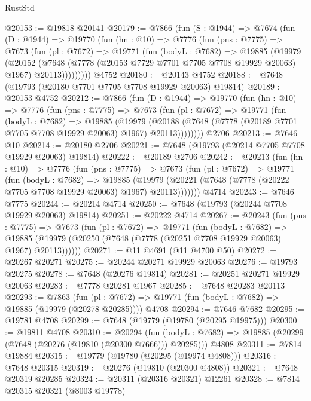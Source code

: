 \begin{lexlean}{RustStd}
\begin{coremodule}
{\begin{coremodule}
{{{{{{{{{{{{{{{{{{{{{{{{{{{{{{{{{{{{{{{{{{{{{{{{{{{{{@20153 := @19818 @20141
@20179 := @7866
    (fun (S : @1944) =>
    @7674
      (fun (D : @1944) =>
      @19770
        (fun (hn : @10) =>
        @7776
          (fun (pns : @7775) =>
          @7673
            (fun (pl : @7672) =>
            @19771
              (fun (bodyL : @7682) =>
              @19885
                (@19979
                  (@20152
                    (@7648
                      (@7778 (@20153 @7729 @7701 @7705 @7708 @19929 @20063) @1967)
                      @20113)))))))))
    @4752
@20180 := @20143 @4752
@20188 := @7648 (@19793 (@20180 @7701 @7705 @7708 @19929 @20063) @19814)
@20189 := @20153 @4752
@20212 := @7866
    (fun (D : @1944) =>
    @19770
      (fun (hn : @10) =>
      @7776
        (fun (pns : @7775) =>
        @7673
          (fun (pl : @7672) =>
          @19771
            (fun (bodyL : @7682) =>
            @19885
              (@19979
                (@20188 (@7648 (@7778 (@20189 @7701 @7705 @7708 @19929 @20063) @1967) @20113))))))))
    @2706
@20213 := @7646 @10
@20214 := @20180 @2706
@20221 := @7648 (@19793 (@20214 @7705 @7708 @19929 @20063) @19814)
@20222 := @20189 @2706
@20242 := @20213
    (fun (hn : @10) =>
    @7776
      (fun (pns : @7775) =>
      @7673
        (fun (pl : @7672) =>
        @19771
          (fun (bodyL : @7682) =>
          @19885
            (@19979 (@20221 (@7648 (@7778 (@20222 @7705 @7708 @19929 @20063) @1967) @20113)))))))
    @4714
@20243 := @7646 @7775
@20244 := @20214 @4714
@20250 := @7648 (@19793 (@20244 @7708 @19929 @20063) @19814)
@20251 := @20222 @4714
@20267 := @20243
    (fun (pns : @7775) =>
    @7673
      (fun (pl : @7672) =>
      @19771
        (fun (bodyL : @7682) =>
        @19885 (@19979 (@20250 (@7648 (@7778 (@20251 @7708 @19929 @20063) @1967) @20113))))))
@20271 := @11 @4691 (@11 @4700 @50)
@20272 := @20267 @20271
@20275 := @20244 @20271 @19929 @20063
@20276 := @19793 @20275
@20278 := @7648 (@20276 @19814)
@20281 := @20251 @20271 @19929 @20063
@20283 := @7778 @20281 @1967
@20285 := @7648 @20283 @20113
@20293 := @7863
    (fun (pl : @7672) => @19771 (fun (bodyL : @7682) => @19885 (@19979 (@20278 @20285))))
    @4708
@20294 := @7646 @7682
@20295 := @19781 @4708
@20299 := @7648 (@19779 (@19780 (@20295 @19975)))
@20300 := @19811 @4708
@20310 := @20294
    (fun (bodyL : @7682) => @19885 (@20299 (@7648 (@20276 (@19810 (@20300 @7666))) @20285)))
    @4808
@20311 := @7814 @19884
@20315 := @19779 (@19780 (@20295 (@19974 @4808)))
@20316 := @7648 @20315
@20319 := @20276 (@19810 (@20300 @4808))
@20321 := @7648 @20319 @20285
@20324 := @20311 (@20316 @20321) @12261
@20328 := @7814 @20315 @20321 (@8003 @19778)
}}}}}}}}}}}}}}}}}}}}}}}}}}}}}}}}}}}}}}}}}}}}}}}}}}}}}
\end{coremodule}}
\end{coremodule}
\end{lexlean}
